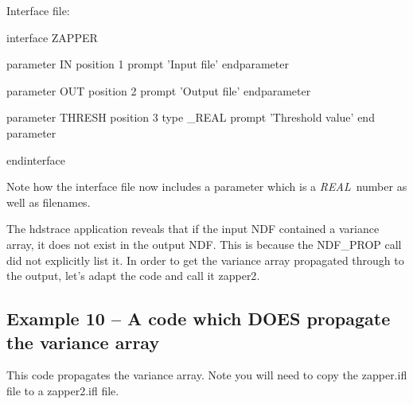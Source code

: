 \documentclass[11pt,nolof]{starlink}
\begin{document}
Interface file:

\begin{small}
\begin{terminalv}
interface ZAPPER

 parameter IN
  position 1
  prompt 'Input file'
 endparameter

 parameter OUT
  position 2
  prompt 'Output file'
 endparameter

 parameter THRESH
  position 3
  type _REAL
  prompt 'Threshold value'
 end parameter

endinterface
\end{terminalv}
\end{small}

Note how the interface file now includes a parameter which is a \emph{REAL}\,
number as well as filenames.

The \textsf{hdstrace} application
reveals that if the input NDF contained a variance array, it does not
exist in the output NDF. This is because the
\textsf{NDF\_PROP} call did
not explicitly list it. In order to get the variance array propagated
through to the output, let's adapt the code and call it \textsf{zapper2}.

\subsection{Example 10 -- A code which DOES propagate the variance array}

This code propagates the variance array. Note you will need to copy the
\textsf{zapper.ifl} file to a \textsf{zapper2.ifl} file.
\end{document}
